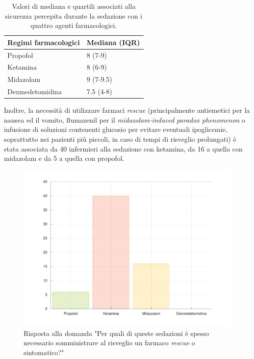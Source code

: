 \bgroup
\def\arraystretch{1.5}
\begin{table}[h]
    \centering
    \begin{tabular}{|l|l|}
         Regimi farmacologici & Mediana (IQR) \\ \hline
       Propofol & 8 (7-9)  \\
       Ketamina & 8 (6-9) \\
       Midazolam & 9 (7-9.5) \\
       Dexmedetomidina & 7.5 (4-8) 
    \end{tabular}
    \caption{Valori di mediana e quartili associati alla sicurezza percepita durante la sedazione con i quattro agenti farmacologici.}
    \label{tab:sicurezzased}
\end{table}
\egroup

Inoltre, la necessità di utilizzare farmaci \emph{rescue} (principalmente antiemetici per la nausea ed il vomito, flumazenil per il \emph{midazolam-induced paradox phenomenon} o infusione di soluzioni contenenti glucosio per evitare eventuali ipoglicemie, soprattutto nei pazienti più piccoli, in caso di tempi di risveglio prolungati) è stata associata da 40 infermieri alla sedazione con ketamina, da 16 a quella con midazolam e da 5 a quella con propofol.

\begin{figure}[!h]
    \centering
    \includegraphics[width=1\textwidth]{Figure/rescue.pdf}
    \caption{Risposta alla domanda "Per quali di queste sedazioni è spesso necessario somministrare al risveglio un farmaco \emph{rescue} o sintomatico?"}
    \label{fig:rescue}
\end{figure}

